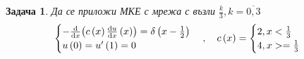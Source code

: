 \documentclass[12pt]{article}
\newtheorem{problem}{Задача}
\begin{document}
\begin{Large}
\begin{problem}
Да се приложи МКЕ с мрежа с възли $\frac{k}{3}, k=\overline{0,3}$ 
\begin{equation}
    \begin{cases}
      -\dv{x}(c\left(x\right)\dv{u}{x}\left(x\right)) = \delta\left(x-\frac{1}{2}\right) \\
      u\left(0\right)=u'\left(1\right)=0
    \end{cases} , \quad
    c\left(x\right)
    =
    \begin{cases}
      2, x<\frac{1}{3} \\
      4, x>=\frac{1}{3} \\
    \end{cases} \\
\end{equation}
\end{problem}


\end{Large}
\end{document}
